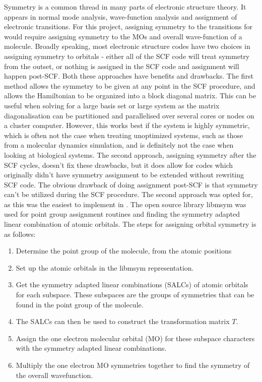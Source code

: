 Symmetry is a common thread in many parts of electronic structure 
theory. It appears in normal mode analysis, wave-function analysis and assignment
of electronic transitions. For this project, assigning symmetry to the transitions
for \dscf would require assigning symmetry to the MOs and overall wave-function of
a molecule.
Broadly speaking, most electronic structure codes have two choices in assigning
symmetry to orbitals - either all of the SCF code will treat symmetry from the 
outset, or nothing is assigned in the SCF code and assignment will happen post-SCF.
Both these approaches have benefits and drawbacks. The first method allows the 
symmetry to be given at any point in the SCF procedure, and allows the Hamiltonian
to be organized into a block diagonal matrix. This can be useful when solving
for a large basis set or large system as the matrix diagonalisation can be
partitioned and parallelised over several cores or nodes on a cluster computer.
However, this works best if the system is highly symmetric, which is often not
the case when treating unoptimized systems, such as those from a molecular dynamics
simulation, and is definitely not the case when looking at biological systems.
The second approach, assigning symmetry after the SCF cycles, doesn't fix these
drawbacks, but it does allow for codes which originally didn't have symmetry
assignment to be extended without rewriting SCF code. The obvious drawback of
doing assignment post-SCF is that symmetry can't be utilized during the SCF procedure.
The second approach was opted for, as this was the easiest to implement in .
The open source library libmsym \cite{libmsym} was used for point group assignment
routines and finding the symmetry adapted linear combination of atomic orbitals.
The steps for assigning orbital symmetry is as follows:

\begin{enumerate}
    \item Determine the point group of the molecule, from the atomic positions
    \item Set up the atomic orbitals in the libmsym representation.
    \item Get the symmetry adapted linear combinations (SALCs) of atomic orbitals for 
    each subspace. These subspaces are the groups of symmetries that can be found
    in the point group of the molecule.
    \item The SALCs can then be used to construct the transformation matrix $T$.
    \item Assign the one electron molecular orbital (MO) for these subspace characters
     with the symmetry adapted linear combinations.
    \item Multiply the one electron MO symmetries together to find the symmetry 
    of the overall wavefunction.
\end{enumerate}

